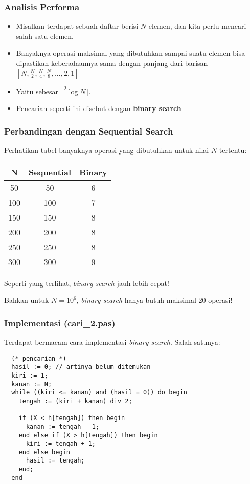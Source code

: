 \documentclass{beamer}
\begin{document}
\begin{frame}
\frametitle{Analisis Performa}
\begin{itemize}
  \item Misalkan terdapat sebuah daftar berisi $N$ elemen, dan kita perlu mencari salah satu elemen.
  \item Banyaknya operasi maksimal yang dibutuhkan sampai suatu elemen bisa dipastikan keberadaannya sama dengan panjang dari barisan $[N, \frac{N}{2}, \frac{N}{4}, \frac{N}{8}, ..., 2, 1]$
  \item Yaitu sebesar $\lceil ^2\log{N} \rceil$.
  \item Pencarian seperti ini disebut dengan \alert{\textbf{binary search}}
\end{itemize}
\end{frame}

\begin{frame}
\frametitle{Perbandingan dengan Sequential Search}
Perhatikan tabel banyaknya operasi yang dibutuhkan untuk nilai $N$ tertentu:
\begin{table}[ht]
  \begin{tabular}{|c|c|c|}
    \hline N  & Sequential  & Binary \\
    \hline 50 & 50 & 6 \\
    \hline 100 & 100 & 7 \\
    \hline 150 & 150 & 8 \\
    \hline 200 & 200 & 8 \\
    \hline 250 & 250 & 8 \\
    \hline 300 & 300 & 9 \\
    \hline
  \end{tabular}
\end{table}
Seperti yang terlihat, \textit{binary search} jauh lebih cepat!

Bahkan untuk $N = 10^6$, \textit{binary search} hanya butuh maksimal 20 operasi!
\end{frame}

\begin{frame}[fragile]
\frametitle{Implementasi (cari\_2.pas)}
Terdapat bermacam cara implementasi \textit{binary search}. Salah satunya:
\begin{lstlisting}
  (* pencarian *)
  hasil := 0; // artinya belum ditemukan
  kiri := 1;
  kanan := N;
  while ((kiri <= kanan) and (hasil = 0)) do begin
    tengah := (kiri + kanan) div 2;

    if (X < h[tengah]) then begin
      kanan := tengah - 1;
    end else if (X > h[tengah]) then begin
      kiri := tengah + 1;
    end else begin
      hasil := tengah;
    end;
  end
\end{lstlisting}
\end{frame}
\end{document}
